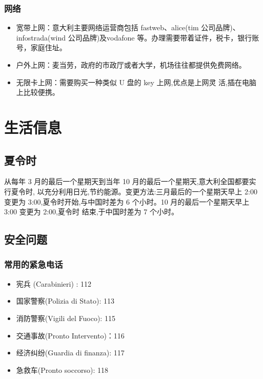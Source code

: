 \documentclass[3pt,a5paper,openright,twoside]{book}
\begin{document}
\subsection{网络}

\begin{itemize}
\item 宽带上网：意大利主要网络运营商包括 fastweb、alice(tim 公司品牌)、infostrada(wind 公司品牌)及vodafone 等。办理需要带着证件，税卡，银行账号，家庭住址。
\item 户外上网：麦当劳，政府的市政厅或者大学，机场往往都提供免费网络。
\item 无限卡上网：需要购买一种类似 U 盘的 key 上网,优点是上网灵 活,插在电脑上比较便携。
\end{itemize}


% 
%
%
%
\chapter{生活信息}              

\section{夏令时} 

从每年 3 月的最后一个星期天到当年 10 月的最后一个星期天,意大利全国都要实行夏令时, 以充分利用日光,节约能源。变更方法:三月最后的一个星期天早上 2:00 变更为 3:00,夏令时开始,与中国时差为 6 个小时。10 月的最后一个星期天早上 3:00 变更为 2:00,夏令时 结束,于中国时差为 7 个小时。

\section{安全问题}

\subsection{常用的紧急电话}

\begin{itemize}
\item 宪兵 (Carabinieri) : 112 
\item 国家警察(Polizia di Stato): 113 
\item 消防警察(Vigili del Fuoco): 115 
\item 交通事故(Pronto Intervento)：116 
\item 经济纠纷(Guardia di finanza): 117
\item 急救车(Pronto soccorso): 118
\end{itemize}
\end{document}
